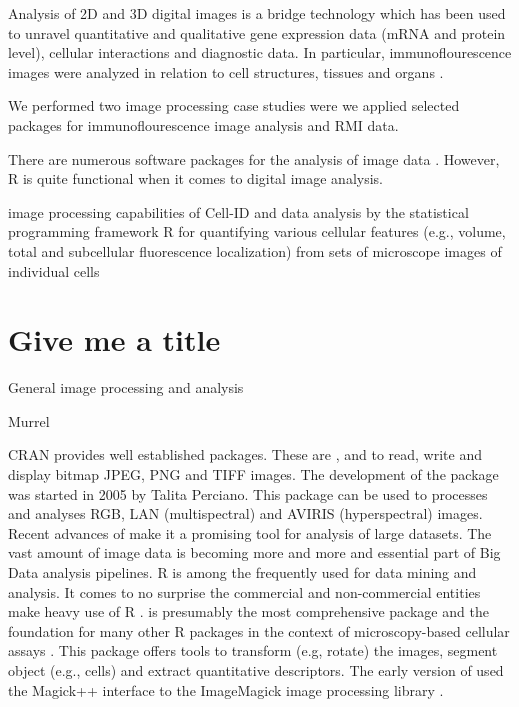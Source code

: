 Analysis of 2D and 3D digital images is a bridge technology which has been used 
to unravel quantitative and qualitative gene expression data (mRNA and protein 
level), cellular interactions and diagnostic data. In particular, 
immunoflourescence images were analyzed in relation to cell structures, tissues 
and organs \citep{chieco_image_2013, rodiger_highly_2013, 
schierack_species-specific_2014, willitzki_new_2012}.

We performed two image processing case studies were we applied selected 
packages for immunoflourescence image analysis and RMI data. 

There are numerous software packages for the analysis of image data 
\citep{wiesmann_review_2015}. However, R is quite functional when it comes to 
digital image analysis.

image processing capabilities of Cell-ID and data analysis by the statistical 
programming framework R for quantifying various cellular features (e.g., volume, 
total and subcellular fluorescence localization) from sets of microscope 
images of individual cells \citep{bush_using_2012}


\section{Give me a title}

General image processing and analysis


\citep{tabelow_modeling_2012, tabelow_dti:_2014}

Murrel \citep{murrell_raster_2011}
 \citep{clayden_mmand:_2016}

CRAN provides well established packages. These are ,  
and  to read, write and display bitmap JPEG, PNG and TIFF images. 
The development of the  \citep{perciano_ripa:_2014} package was 
started in 2005 by Talita Perciano. This package can be used to processes and 
analyses RGB, LAN (multispectral) and AVIRIS (hyperspectral) images. Recent 
advances of  make it a promising tool for analysis of large 
datasets. The vast amount of image data is becoming more and more and essential 
part of Big Data analysis pipelines. R is among the frequently used for data 
mining and analysis. It comes to no surprise the commercial and non-commercial 
entities make heavy use of R \citep{chen_big_2014}.  
\citep{pau_ebimager_2010} is presumably the most comprehensive package and the 
foundation for many other R packages in the context of microscopy-based cellular 
assays \citep{gowen_near_2015}. This package offers tools to transform (e.g, 
rotate) the images, segment object (e.g., cells) and extract quantitative 
descriptors. The early version of  used the Magick++ interface 
to the ImageMagick image processing library \citep{sklyar_image_2006}.


